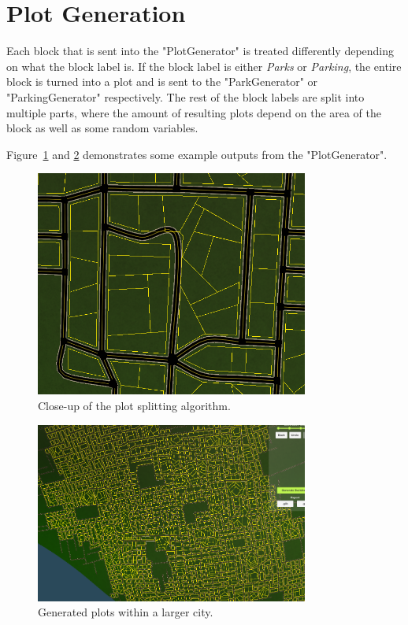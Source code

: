 \section{Plot Generation}
Each block that is sent into the "PlotGenerator" is treated differently depending on what the block label is. 
If the block label is either \textit{Parks} or \textit{Parking}, the entire block is turned into a plot and is sent to the "ParkGenerator" or "ParkingGenerator" respectively.
The rest of the block labels are split into multiple parts, where the amount of resulting plots depend on the area of the block as well as some random variables. 

Figure~\ref{fig:plot2} and \ref{fig:plot} demonstrates some example outputs from the "PlotGenerator".

\begin{figure}[H]
  \centering

  \includegraphics[width=0.8\textwidth]{figure/plot2.png}
  \caption{Close-up of the plot splitting algorithm.}

  \label{fig:plot2}
\end{figure}

\begin{figure}[H]
  \centering

  \includegraphics[width=0.8\textwidth]{figure/plot.png}
  \caption{Generated plots within a larger city.}

  \label{fig:plot}
\end{figure}

